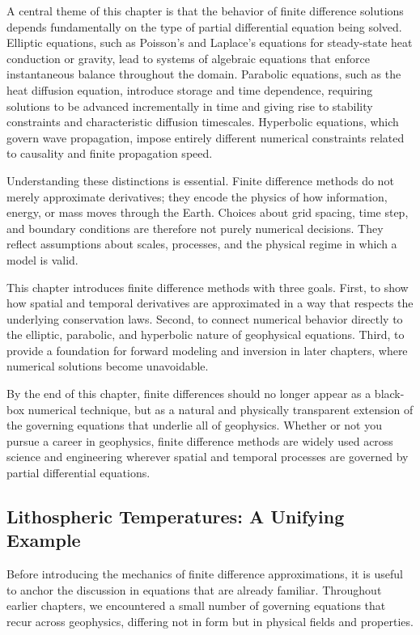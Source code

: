 A central theme of this chapter is that the behavior of finite difference solutions depends fundamentally on the type of partial differential equation being solved. Elliptic equations, such as Poisson's and Laplace's equations for steady-state heat conduction or gravity, lead to systems of algebraic equations that enforce instantaneous balance throughout the domain. Parabolic equations, such as the heat diffusion equation, introduce storage and time dependence, requiring solutions to be advanced incrementally in time and giving rise to stability constraints and characteristic diffusion timescales. Hyperbolic equations, which govern wave propagation, impose entirely different numerical constraints related to causality and finite propagation speed.

Understanding these distinctions is essential. Finite difference methods do not merely approximate derivatives; they encode the physics of how information, energy, or mass moves through the Earth. Choices about grid spacing, time step, and boundary conditions are therefore not purely numerical decisions. They reflect assumptions about scales, processes, and the physical regime in which a model is valid.

This chapter introduces finite difference methods with three goals. First, to show how spatial and temporal derivatives are approximated in a way that respects the underlying conservation laws. Second, to connect numerical behavior directly to the elliptic, parabolic, and hyperbolic nature of geophysical equations. Third, to provide a foundation for forward modeling and inversion in later chapters, where numerical solutions become unavoidable.

By the end of this chapter, finite differences should no longer appear as a black-box numerical technique, but as a natural and physically transparent extension of the governing equations that underlie all of geophysics. Whether or not you pursue a career in geophysics, finite difference methods are widely used across science and engineering wherever spatial and temporal processes are governed by partial differential equations.

\subsection{Lithospheric Temperatures: A Unifying Example}

Before introducing the mechanics of finite difference approximations, it is useful to anchor the discussion in equations that are already familiar.  Throughout earlier chapters, we encountered a small number of governing equations that recur across geophysics, differing not in form but in physical fields and properties.

